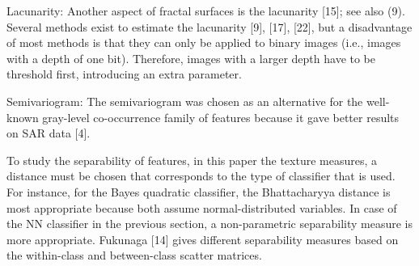 \documentclass[paper=a4, fontsize=11pt]{scrartcl}
\begin{document}
Lacunarity: Another aspect of fractal surfaces is the lacunarity [15]; see also (9). 
Several methods exist to estimate the lacunarity [9], [17], [22], but a disadvantage of most methods is that they can only be applied to binary images (i.e., images with a depth of one bit). 
Therefore, images with a larger depth have to be threshold first, introducing an extra parameter. 

Semivariogram: The semivariogram was chosen as an alternative for the well-known gray-level co-occurrence family of features because it gave better results on SAR data [4].

To study the separability of features, in this paper the texture measures, a distance must be chosen that corresponds to the type of classifier that is used. 
For instance, for the Bayes quadratic classifier, the Bhattacharyya distance is most appropriate because both assume normal-distributed variables. 
In case of the NN classifier in the previous section, a non-parametric separability measure is more appropriate. 
Fukunaga [14] gives different separability measures based on the within-class and between-class scatter matrices.
\end{document}
